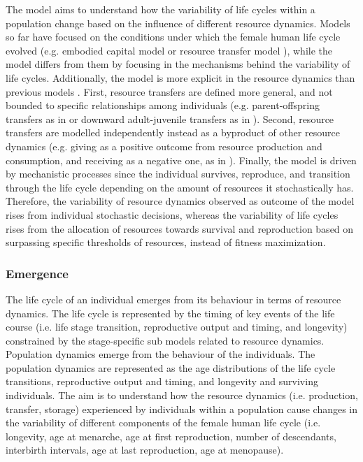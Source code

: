 \documentclass{article}
\begin{document}
The model aims to understand how the variability of life cycles within a population change based on the influence of different resource dynamics. Models so far have focused on the conditions under which the female human life cycle evolved (e.g. embodied capital model \citep{kaplan1996theory} or resource transfer model \citep{chu2006co}), while the model differs from them by focusing in the mechanisms behind the variability of life cycles. Additionally, the model is more explicit in the resource dynamics than previous models \citep{price2020fitness,kaplan1996theory,chu2006co,lee2003rethinking,kramer2010pooled, van1986acquisition}. First, resource transfers are defined more general, and not bounded to specific relationships among individuals (e.g. parent-offspring transfers as in \cite{kaplan1996theory} or downward adult-juvenile transfers as in \cite{chu2006co}). Second, resource transfers are modelled independently instead as a byproduct of other resource dynamics (e.g. giving as a positive outcome from resource production and consumption, and receiving as a negative one, as in \cite{lee2003rethinking,chu2006co}). Finally, the model is driven by mechanistic processes since the individual survives, reproduce, and transition through the life cycle depending on the amount of resources it stochastically has. Therefore, the variability of resource dynamics observed as outcome of the model rises from individual stochastic decisions, whereas the variability of life cycles rises from the allocation of resources towards survival and reproduction based on surpassing specific thresholds of resources, instead of fitness maximization.

\subsubsection{Emergence}

The life cycle of an individual emerges from its behaviour in terms of resource dynamics. The life cycle is represented by the timing of key events of the life course (i.e. life stage transition, reproductive output and timing, and longevity) constrained by the stage-specific sub models related to resource dynamics. Population dynamics emerge from the behaviour of the individuals. The population dynamics are represented as the age distributions of the life cycle transitions, reproductive output and timing, and longevity and surviving individuals. The aim is to understand how the resource dynamics (i.e. production, transfer, storage) experienced by individuals within a population cause changes in the variability of different components of the female human life cycle (i.e. longevity, age at menarche, age at first reproduction, number of descendants, interbirth intervals, age at last reproduction, age at menopause).
\end{document}
